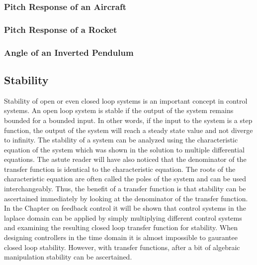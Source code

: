 \subsubsection{Pitch Response of an Aircraft}

\subsubsection{Pitch Response of a Rocket}

\subsubsection{Angle of an Inverted Pendulum}

\subsection{Stability}

Stability of open or even closed loop systems is an important concept in control systems. An open loop system is stable if the output of the system remains bounded for a bounded input. In other words, if the input to the system is a step function, the output of the system will reach a steady state value and not diverge to infinity. The stability of a system can be analyzed using the characteristic equation of the system which was shown in the solution to multiple differential equations. The astute reader will have also noticed that the denominator of the transfer function is identical to the characteristic equation. The roots of the characteristic equation are often called the poles of the system and can be used interchangeably. Thus, the benefit of a transfer function is that stability can be ascertained immediately by looking at the denominator of the transfer function. In the Chapter on feedback control it will be shown that control systems in the laplace domain can be applied by simply multiplying different control systems and examining the resulting closed loop transfer function for stability. When designing controllers in the time domain it is almost impossible to gaurantee closed loop stability. However, with transfer functions, after a bit of algebraic manipulation stability can be ascertained. 

